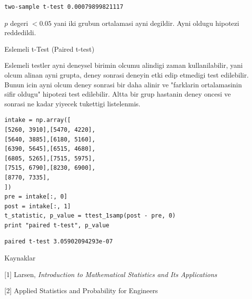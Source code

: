 \documentclass[12pt,fleqn]{article}\usepackage{../common}
\begin{document}
\begin{verbatim}
two-sample t-test 0.00079899821117
\end{verbatim}

$p$ degeri $< 0.05$ yani iki grubun ortalamasi ayni degildir. Ayni oldugu
hipotezi reddedildi.

Eslemeli t-Test (Paired t-test)

Eslemeli testler ayni deneysel birimin olcumu alindigi zaman
kullanilabilir, yani olcum alinan ayni grupta, deney sonrasi deneyin
etki edip etmedigi test edilebilir. Bunun icin ayni olcum deney
sonrasi bir daha alinir ve "farklarin ortalamasinin sifir oldugu"
hipotezi test edilebilir. Altta bir grup hastanin deney oncesi ve
sonrasi ne kadar yiyecek tukettigi listelenmis. 

\begin{verbatim}
intake = np.array([
[5260, 3910],[5470, 4220],
[5640, 3885],[6180, 5160],
[6390, 5645],[6515, 4680],
[6805, 5265],[7515, 5975],
[7515, 6790],[8230, 6900],
[8770, 7335],
])
pre = intake[:, 0]
post = intake[:, 1]
t_statistic, p_value = ttest_1samp(post - pre, 0)
print "paired t-test", p_value
\end{verbatim}

\begin{verbatim}
paired t-test 3.05902094293e-07
\end{verbatim}

Kaynaklar

[1] Larsen, {\em Introduction to Mathematical Statistics and Its Applications}

[2] Applied Statistics and Probability for Engineers
\end{document}
